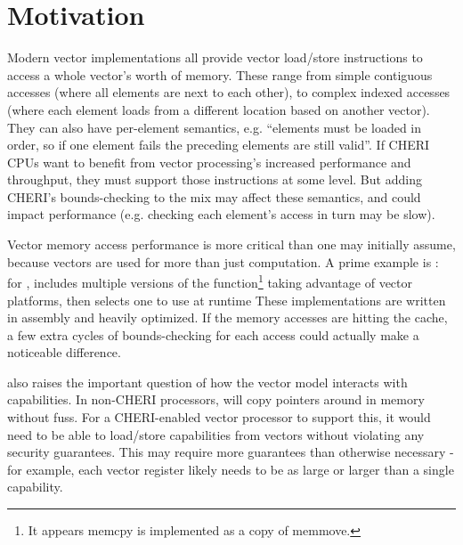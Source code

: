

\section{Motivation}
Modern vector implementations all provide vector load/store instructions to access a whole vector's worth of memory.
These range from simple contiguous accesses (where all elements are next to each other), to complex indexed accesses (where each element loads from a different location based on another vector).
They can also have per-element semantics, e.g. ``elements must be loaded in order, so if one element fails the preceding elements are still valid''.
If CHERI CPUs want to benefit from vector processing's increased performance and throughput, they must support those instructions at some level.
But adding CHERI's bounds-checking to the mix may affect these semantics, and could impact performance (e.g. checking each element's access in turn may be slow).

Vector memory access performance is more critical than one may initially assume, because vectors are used for more than just computation.
A prime example is : for ,  includes multiple versions of the function\footnote{It appears memcpy is implemented as a copy of memmove.} taking advantage of vector platforms, then selects one to use at runtime
These implementations are written in assembly and heavily optimized.
If the memory accesses are hitting the cache, a few extra cycles of bounds-checking for each access could actually make a noticeable difference.

 also raises the important question of how the vector model interacts with capabilities.
In non-CHERI processors,  will copy pointers around in memory without fuss.
For a CHERI-enabled vector processor to support this, it would need to be able to load/store capabilities from vectors without violating any security guarantees.
This may require more guarantees than otherwise necessary - for example, each vector register likely needs to be as large or larger than a single capability.

